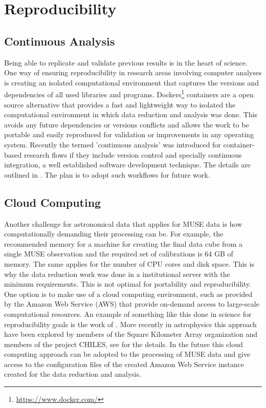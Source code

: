 

\section{Reproducibility}


\subsection{Continuous Analysis}


Being able to replicate and validate previous results is in the heart of science. One way of ensuring reproducibility in research areas involving computer analyses is creating an isolated computational environment that captures the versions and dependencies of all used libraries and programs. Dockers\footnote{\url{https://www.docker.com/}} containers are a open source alternative that provides a fast and lightweight way to isolated the computational environment in which data reduction and analysis was done. This  avoids any future dependencies or versions conflicts and allows the work to be portable and easily reproduced for validation or improvements in any operating system. Recently the termed 'continuous analysis' was introduced for container-based research flows if they include version control and specially continuous integration, a well established software development technique. The details are outlined in \cite{Beaulieu-Jones056473}. The plan is to adopt such workflows for future work.  

\subsection{Cloud Computing}

Another challenge for astronomical data that applies for MUSE data is how computationally demanding their processing can be. For example, the recommended memory for a machine for creating the final data cube from a single MUSE observation and the required set of calibrations is 64 GB of memory. The same applies for the number of CPU cores and disk space. This is why the data reduction work was done in a institutional server with the minimum requirements. This is not optimal for portability and reproducibility. One option is to make use of a cloud computing environment, such as provided by the Amazon Web Service (AWS) that provide on-demand access to large-scale computational resources. An example of something like this done in science for reproducibility goals is the work of \cite{ragan-kelley_collaborative_2013}. More recently in astrophysics this approach have been explored by members of the Square Kilometer Array organization and members of the project CHILES, see \cite{Dodson_SKAAmazon_2016} for the details. In the future this cloud computing approach can be adopted to the processing of MUSE data and give access to the configuration files of the created Amazon Web Service instance created for the data reduction and analysis.  



